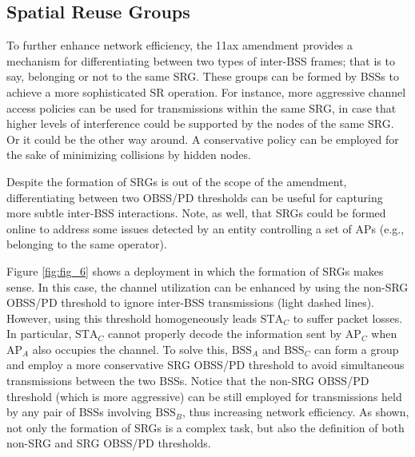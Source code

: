 \documentclass{ieeeaccess}
\begin{document}
\subsection{Spatial Reuse Groups}
\label{section:srg}
To further enhance network efficiency, the 11ax amendment provides a mechanism for differentiating between two types of inter-BSS frames; that is to say, belonging or not to the same SRG. These groups can be formed by BSSs to achieve a more sophisticated SR operation. For instance, more aggressive channel access policies can be used for transmissions within the same SRG, in case that higher levels of interference could be supported by the nodes of the same SRG. Or it could be the other way around. A conservative policy can be employed for the sake of minimizing collisions by hidden nodes. 

Despite the formation of SRGs is out of the scope of the amendment, differentiating between two OBSS/PD thresholds can be useful for capturing more subtle inter-BSS interactions. Note, as well, that SRGs could be formed online to address some issues detected by an entity controlling a set of APs (e.g., belonging to the same operator).

Figure \ref{fig:fig_6} shows a deployment in which the formation of SRGs makes sense. In this case, the channel utilization can be enhanced by using the non-SRG OBSS/PD threshold to ignore inter-BSS transmissions (light dashed lines). However, using this threshold homogeneously leads  $\text{STA}_C$ to suffer packet losses. In particular, $\text{STA}_C$ cannot properly decode the information sent by $\text{AP}_C$ when $\text{AP}_A$ also occupies the channel. To solve this, $\text{BSS}_A$ and $\text{BSS}_C$ can form a group and employ a more conservative SRG OBSS/PD threshold to avoid simultaneous transmissions between the two BSSs. Notice that the non-SRG OBSS/PD threshold (which is more aggressive) can be still employed for transmissions held by any pair of BSSs involving $\text{BSS}_B$, thus increasing network efficiency. As shown, not only the formation of SRGs is a complex task, but also the definition of both non-SRG and SRG OBSS/PD thresholds.
\end{document}
